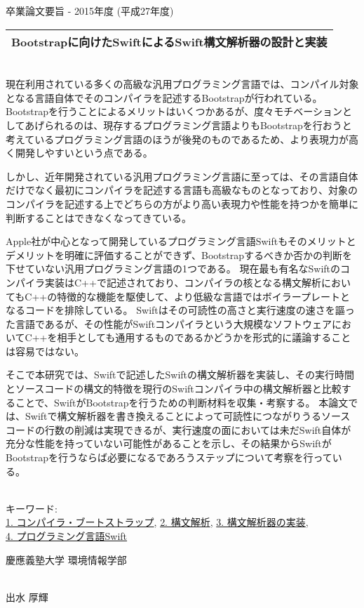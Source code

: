 卒業論文要旨 - 2015年度 (平成27年度)
~ \\
\begin{center}
\begin{Large}
\begin{tabular}{|c|} \hline
Bootstrapに向けたSwiftによるSwift構文解析器の設計と実装
\\ \hline
\end{tabular}
\end{Large}
\end{center}
~  \\

現在利用されている多くの高級な汎用プログラミング言語では、コンパイル対象となる言語自体でそのコンパイラを記述するBootstrapが行われている。
Bootstrapを行うことによるメリットはいくつかあるが、度々モチベーションとしてあげられるのは、現存するプログラミング言語よりもBootstrapを行おうと考えているプログラミング言語のほうが後発のものであるため、より表現力が高く開発しやすいという点である。

しかし、近年開発されている汎用プログラミング言語に至っては、その言語自体だけでなく最初にコンパイラを記述する言語も高級なものとなっており、対象のコンパイラを記述する上でどちらの方がより高い表現力や性能を持つかを簡単に判断することはできなくなってきている。

Apple社が中心となって開発しているプログラミング言語Swiftもそのメリットとデメリットを明確に評価することができず、Bootstrapするべきか否かの判断を下せていない汎用プログラミング言語の1つである。
現在最も有名なSwiftのコンパイラ実装はC++で記述されており、コンパイラの核となる構文解析においてもC++の特徴的な機能を駆使して、より低級な言語ではボイラープレートとなるコードを排除している。
Swiftはその可読性の高さと実行速度の速さを謳った言語であるが、その性能がSwiftコンパイラという大規模なソフトウェアにおいてC++を相手としても通用するものであるかどうかを形式的に議論することは容易ではない。

そこで本研究では、Swiftで記述したSwiftの構文解析器を実装し、その実行時間とソースコードの構文的特徴を現行のSwiftコンパイラ中の構文解析器と比較することで、SwiftがBootstrapを行うための判断材料を収集・考察する。
本論文では、Swiftで構文解析器を書き換えることによって可読性につながりうるソースコードの行数の削減は実現できるが、実行速度の面においては未だSwift自体が充分な性能を持っていない可能性があることを示し、その結果からSwiftがBootstrapを行うならば必要になるであろうステップについて考察を行っている。

~ \\
キーワード:\\
\underline{1. コンパイラ・ブートストラップ},
\underline{2. 構文解析},
\underline{3. 構文解析器の実装},\\
\underline{4. プログラミング言語Swift}
\begin{flushright}
慶應義塾大学 環境情報学部\\
~ \\
\begin{Large}
出水 厚輝
\end{Large}
\end{flushright}
